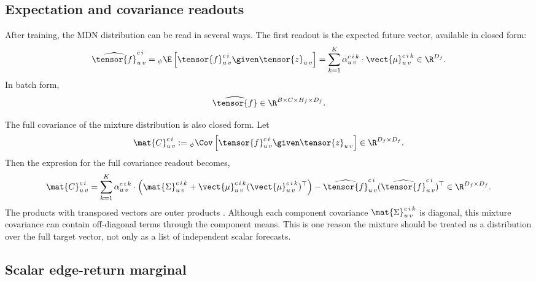 \newpage{}
\subsection{Expectation and covariance readouts}
\label{subsec:mdn-expectation-and-covariance}

After training, the MDN distribution can be read in several ways.  The first
readout is the expected future vector, available in closed form:
\[
  \widehat{\tensor{f}}_{u\,v}^{c\,i}
  =
  {}_{\psi}\E
  \left[
    \tensor{f}_{u\,v}^{c\,i}\given\tensor{z}_{u\,v}
  \right]
  =
  \sum_{k=1}^{K}
  \alpha_{u\,v}^{c\,i\,k}\cdot
  \vect{\mu}_{u\,v}^{c\,i\,k}
  \in\R^{D_f}.
\]
In batch form,
\[
  \widehat{\tensor{f}}
  \in
  \R^{B\times C\times H_f\times D_f}.
\]

The full covariance of the mixture distribution is also closed form.  Let
\[
  \mat{C}_{u\,v}^{c\,i}
  :=
  {}_{\psi}\Cov
  \left[
    \tensor{f}_{u\,v}^{c\,i}
    \given
    \tensor{z}_{u\,v}
  \right]
  \in\R^{D_f\times D_f}.
\]
Then the expresion for the full covariance readout becomes,
\[
  \mat{C}_{u\,v}^{c\,i}
  =
  \sum_{k=1}^{K}
  \alpha_{u\,v}^{c\,i\,k}\cdot
  \left(
    \mat{\Sigma}_{u\,v}^{c\,i\,k}
    +
    \vect{\mu}_{u\,v}^{c\,i\,k}
    (\vect{\mu}_{u\,v}^{c\,i\,k})^{\top}
  \right)
  -
  \widehat{\tensor{f}}_{u\,v}^{c\,i}
  (\widehat{\tensor{f}}_{u\,v}^{c\,i})^{\top}
  \in\R^{D_f\times D_f}.
\]
The products with transposed vectors are outer products%
. Although each component covariance $\mat{\Sigma}_{u\,v}^{c\,i\,k}$ is diagonal,
this mixture covariance can contain off-diagonal terms through the component
means.  This is one reason the mixture should be treated as a distribution over
the full target vector, not only as a list of independent scalar forecasts.




\subsection{Scalar edge-return marginal}
\label{subsec:mdn-scalar-edge-return-marginal}


